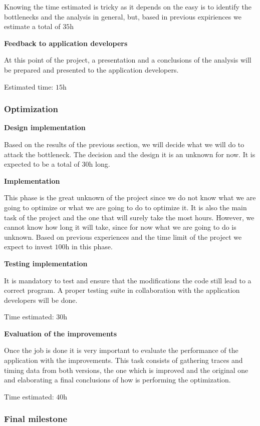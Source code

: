 Knowing the time estimated is tricky as it depends on the easy is to identify the bottlenecks and the analysis in general, but, based in previous expiriences we estimate a total of $\si{35\hour}$

\textbf{Feedback to application developers}

At this point of the project, a presentation and a conclusions of the analysis will be prepared and presented to the application developers.

Estimated time: $\si{15\hour}$

\subsubsection{Optimization}

\textbf{Design implementation}

Based on the results of the previous section, we will decide what we will do to attack the bottleneck. The decision and the design it is an unknown for now. It is expected to be a total of $\si{30\hour}$ long.

\textbf{Implementation}

This phase is the great unknown of the project since we do not know what we are going to optimize or what we are going to do to optimize it. It is also the main task of the project and the one that will surely take the most hours. However, we cannot know how long it will take, since for now what we are going to do is unknown. Based on previous experiences and the time limit of the project we expect to invest $\si{100\hour}$ in this phase.

\textbf{Testing implementation}

It is mandatory to test and ensure that the modifications the code still lead to a correct program. A proper testing suite in collaboration with the application developers will be done.

Time estimated: $\si{30\hour}$

\textbf{Evaluation of the improvements}

Once the job is done it is very important to evaluate the performance of the application with the improvements. This task consists of gathering traces and timing data from both versions, the one which is improved and the original one and elaborating a final conclusions of how is performing the optimization.

Time estimated: $\si{40\hour}$


\subsubsection{Final milestone}


